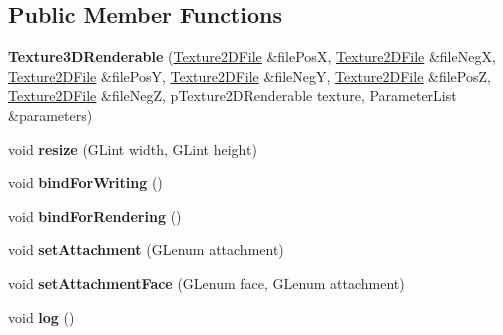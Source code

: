\subsection*{Public Member Functions}
\begin{DoxyCompactItemize}
\item 
\hypertarget{classfillwave_1_1core_1_1Texture3DRenderable_a90865874ca8b87158521320dc2074150}{}{\bfseries Texture3\+D\+Renderable} (\hyperlink{classfillwave_1_1core_1_1Texture2DFile}{Texture2\+D\+File} \&file\+Pos\+X, \hyperlink{classfillwave_1_1core_1_1Texture2DFile}{Texture2\+D\+File} \&file\+Neg\+X, \hyperlink{classfillwave_1_1core_1_1Texture2DFile}{Texture2\+D\+File} \&file\+Pos\+Y, \hyperlink{classfillwave_1_1core_1_1Texture2DFile}{Texture2\+D\+File} \&file\+Neg\+Y, \hyperlink{classfillwave_1_1core_1_1Texture2DFile}{Texture2\+D\+File} \&file\+Pos\+Z, \hyperlink{classfillwave_1_1core_1_1Texture2DFile}{Texture2\+D\+File} \&file\+Neg\+Z, p\+Texture2\+D\+Renderable texture, Parameter\+List \&parameters)\label{classfillwave_1_1core_1_1Texture3DRenderable_a90865874ca8b87158521320dc2074150}

\item 
\hypertarget{classfillwave_1_1core_1_1Texture3DRenderable_a3c3e981f39c7589731f9767733b7c15e}{}void {\bfseries resize} (G\+Lint width, G\+Lint height)\label{classfillwave_1_1core_1_1Texture3DRenderable_a3c3e981f39c7589731f9767733b7c15e}

\item 
\hypertarget{classfillwave_1_1core_1_1Texture3DRenderable_a77e5f1bcab1d8d7965e31c974acbb732}{}void {\bfseries bind\+For\+Writing} ()\label{classfillwave_1_1core_1_1Texture3DRenderable_a77e5f1bcab1d8d7965e31c974acbb732}

\item 
\hypertarget{classfillwave_1_1core_1_1Texture3DRenderable_a757acf792cbc6d4d03ae6628decef23d}{}void {\bfseries bind\+For\+Rendering} ()\label{classfillwave_1_1core_1_1Texture3DRenderable_a757acf792cbc6d4d03ae6628decef23d}

\item 
\hypertarget{classfillwave_1_1core_1_1Texture3DRenderable_a984bc7af84b0ccf9d6e850aeefaeb50c}{}void {\bfseries set\+Attachment} (G\+Lenum attachment)\label{classfillwave_1_1core_1_1Texture3DRenderable_a984bc7af84b0ccf9d6e850aeefaeb50c}

\item 
\hypertarget{classfillwave_1_1core_1_1Texture3DRenderable_a2854b7ea78c8704dc2e07ebe6577d161}{}void {\bfseries set\+Attachment\+Face} (G\+Lenum face, G\+Lenum attachment)\label{classfillwave_1_1core_1_1Texture3DRenderable_a2854b7ea78c8704dc2e07ebe6577d161}

\item 
\hypertarget{classfillwave_1_1core_1_1Texture3DRenderable_a0fd5886033c65d2b642010bf71b1643a}{}void {\bfseries log} ()\label{classfillwave_1_1core_1_1Texture3DRenderable_a0fd5886033c65d2b642010bf71b1643a}

\end{DoxyCompactItemize}
